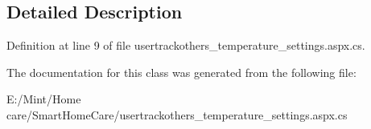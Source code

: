 \subsection{Detailed Description}


Definition at line 9 of file usertrackothers\-\_\-temperature\-\_\-settings.\-aspx.\-cs.



The documentation for this class was generated from the following file\-:\begin{DoxyCompactItemize}
\item 
E\-:/\-Mint/\-Home care/\-Smart\-Home\-Care/usertrackothers\-\_\-temperature\-\_\-settings.\-aspx.\-cs\end{DoxyCompactItemize}
